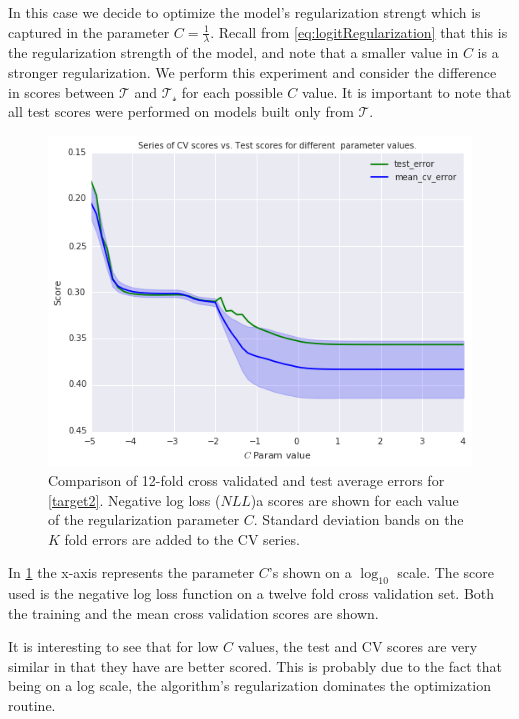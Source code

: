 In this case we decide to optimize the model's regularization strengt which is captured in the parameter $C = \frac{1}{\lambda}$.
Recall from \cref{eq:logitRegularization} that this is the regularization strength of the model, and note that a smaller value in $C$ is a stronger regularization.
We perform this experiment and consider the difference in scores between  $\mathcal{T}$ and $\mathcal{T_s}$ for each possible $C$ value.
It is important to note that all test scores were performed on models built only from $\mathcal{T}$.

\begin{figure}[h!]
\begin{center}
\includegraphics[width=1\columnwidth]{figures/cross_validation/train_and_cv_score_comparison_logreg.jpg}
\caption{ Comparison of 12-fold cross validated and test average errors for \cref{target2}. Negative log loss ($NLL$)a scores are shown for each value of the regularization parameter $C$. Standard deviation bands on the $K$ fold errors are added to the CV series.}
\label{fig:cv_vs_test_score}
\end{center}
\end{figure}

In \cref{fig:cv_vs_test_score} the x-axis represents the parameter $C$'s shown on a $\log_{10}$ scale.
The score used is the negative log loss function on a twelve fold cross validation set.
Both the training and the mean cross validation scores are shown.

It is interesting to see that for low $C$ values, the test and CV scores are very similar in that they have are better scored.
This is probably due to the fact that being on a log scale, the algorithm's regularization dominates the optimization routine.

